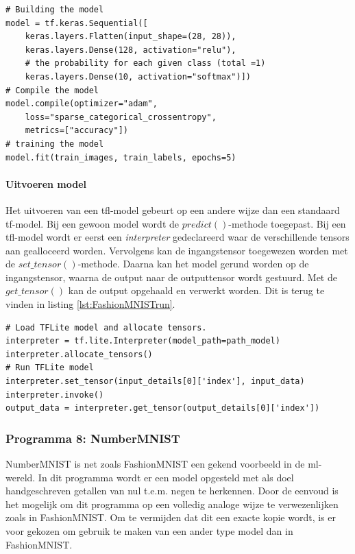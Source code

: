 			\newpage

\begin{lstlisting}[caption={Cre\"eren en trainen van sequentieel model voor FashionMNIST.}, captionpos=b,label={lst:FashionMNISTtrain}]
# Building the model
model = tf.keras.Sequential([
	keras.layers.Flatten(input_shape=(28, 28)),
	keras.layers.Dense(128, activation="relu"),
	# the probability for each given class (total =1)
	keras.layers.Dense(10, activation="softmax")]) 
# Compile the model
model.compile(optimizer="adam",
	loss="sparse_categorical_crossentropy",
	metrics=["accuracy"])
# training the model
model.fit(train_images, train_labels, epochs=5)
\end{lstlisting}			
						
											
			\paragraph{Uitvoeren model}
			Het uitvoeren van een \gls{tfl}-model gebeurt op een andere wijze dan een standaard \gls{tf}-model. Bij een gewoon model wordt de $predict()$-methode toegepast. Bij een \gls{tfl}-model wordt er eerst een \textit{interpreter} gedeclareerd waar de verschillende tensors aan gealloceerd worden. Vervolgens kan de ingangstensor toegewezen worden met de $set\_tensor()$-methode. Daarna kan het model gerund worden op de ingangstensor, waarna de output naar de outputtensor wordt gestuurd. Met de $get\_tensor()$ kan de output opgehaald en verwerkt worden. Dit is terug te vinden in listing \ref{lst:FashionMNISTrun}.
	
	\newpage
	
	\begin{lstlisting}[caption={Runnen van sequentieel model voor FashionMNIST.}, captionpos=b,label={lst:FashionMNISTrun}]
# Load TFLite model and allocate tensors.
interpreter = tf.lite.Interpreter(model_path=path_model)
interpreter.allocate_tensors()
# Run TFLite model
interpreter.set_tensor(input_details[0]['index'], input_data)
interpreter.invoke()
output_data = interpreter.get_tensor(output_details[0]['index'])
\end{lstlisting}				

			\subsubsection{Programma 8: NumberMNIST}
				NumberMNIST is net zoals FashionMNIST een gekend voorbeeld in de \gls{ml}-wereld. In dit programma wordt er een model opgesteld met als doel handgeschreven getallen van nul t.e.m. negen te herkennen. Door de eenvoud is het mogelijk om dit programma op een volledig analoge wijze te verwezenlijken zoals in FashionMNIST. Om te vermijden dat dit een exacte kopie wordt, is er voor gekozen om gebruik te maken van een ander type model dan in FashionMNIST.
					
